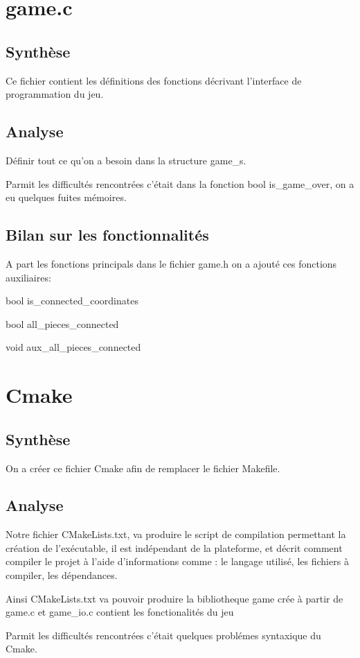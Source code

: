 \documentclass[12pt]{article}
\begin{document}
\section{game.c}
\subsection{Synthèse}
Ce fichier contient les définitions des fonctions décrivant l'interface de programmation du jeu.
\subsection{Analyse}
Définir tout ce qu'on a besoin dans la structure game\_s.

Parmit les difficultés rencontrées c'était dans la fonction bool is\_game\_over, on a eu quelques fuites mémoires.

\subsection{Bilan sur les fonctionnalités}
A part les fonctions principals dans le fichier game.h on a ajouté ces fonctions auxiliaires:

bool is\_connected\_coordinates

bool all\_pieces\_connected

void aux\_all\_pieces\_connected




\section{Cmake}
\subsection{Synthèse}
On a créer ce fichier Cmake afin de remplacer le fichier Makefile.
\subsection{Analyse}
Notre fichier CMakeLists.txt, va produire le script de compilation permettant la création de l'exécutable,
il est indépendant de la plateforme, et décrit comment compiler le projet à l'aide d'informations comme : le langage utilisé, les fichiers à compiler, les dépendances.

Ainsi CMakeLists.txt va pouvoir produire la bibliotheque game crée à partir de game.c et game\_io.c contient les fonctionalités du jeu

Parmit les difficultés rencontrées c'était quelques problémes syntaxique du Cmake.
\end{document}
